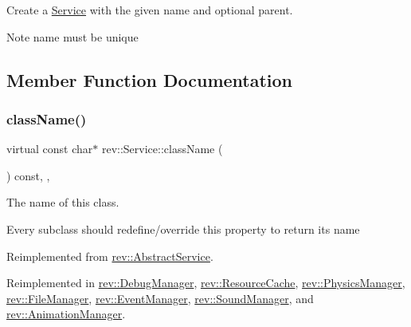 Create a \mbox{\hyperlink{classrev_1_1_service}{Service}} with the given name and optional parent. 

\begin{DoxyNote}{Note}
name must be unique 
\end{DoxyNote}


\subsection{Member Function Documentation}
\mbox{\label{classrev_1_1_service_a484d71757ea6e8780488602cb421a4a5}} 
\subsubsection{\texorpdfstring{className()}{className()}}
{\footnotesize\ttfamily virtual const char$\ast$ rev\+::\+Service\+::class\+Name (\begin{DoxyParamCaption}{ }\end{DoxyParamCaption}) const\hspace{0.3cm}{\ttfamily [inline]}, {\ttfamily [override]}, {\ttfamily [virtual]}}



The name of this class. 

Every subclass should redefine/override this property to return its name 

Reimplemented from \mbox{\hyperlink{classrev_1_1_abstract_service_a0b64ee4651db7637a70265697ca62453}{rev\+::\+Abstract\+Service}}.



Reimplemented in \mbox{\hyperlink{classrev_1_1_debug_manager_a5962e13755e5a3b902f2d3f71e5948cb}{rev\+::\+Debug\+Manager}}, \mbox{\hyperlink{classrev_1_1_resource_cache_ac6abc543146d0f487cfffb79d33d35e0}{rev\+::\+Resource\+Cache}}, \mbox{\hyperlink{classrev_1_1_physics_manager_a557872ba7a7c0fb2074b408f185aa789}{rev\+::\+Physics\+Manager}}, \mbox{\hyperlink{classrev_1_1_file_manager_abfb467bdcfbacd82f041139a15d73fa0}{rev\+::\+File\+Manager}}, \mbox{\hyperlink{classrev_1_1_event_manager_a3999d64126b1b5e0d8d4a47636bfe4c5}{rev\+::\+Event\+Manager}}, \mbox{\hyperlink{classrev_1_1_sound_manager_a1b4c69f6b4e31741ddf76595004fd0fe}{rev\+::\+Sound\+Manager}}, and \mbox{\hyperlink{classrev_1_1_animation_manager_a75045d17ce187cc554ff1b2f12e2fea5}{rev\+::\+Animation\+Manager}}.


